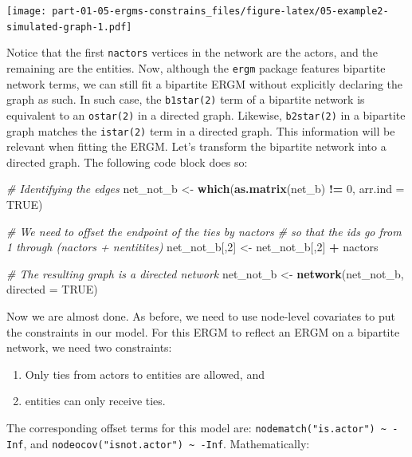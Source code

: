 \documentclass[]{book}
\newenvironment{Shaded}{\begin{snugshade}}{\end{snugshade}}
\newcommand{\CommentTok}[1]{\textcolor[rgb]{0.56,0.35,0.01}{\textit{#1}}}
\newcommand{\DataTypeTok}[1]{\textcolor[rgb]{0.13,0.29,0.53}{#1}}
\newcommand{\DecValTok}[1]{\textcolor[rgb]{0.00,0.00,0.81}{#1}}
\newcommand{\KeywordTok}[1]{\textcolor[rgb]{0.13,0.29,0.53}{\textbf{#1}}}
\newcommand{\NormalTok}[1]{#1}
\newcommand{\OperatorTok}[1]{\textcolor[rgb]{0.81,0.36,0.00}{\textbf{#1}}}
\newcommand{\OtherTok}[1]{\textcolor[rgb]{0.56,0.35,0.01}{#1}}
\newcommand{\StringTok}[1]{\textcolor[rgb]{0.31,0.60,0.02}{#1}}
\providecommand{\tightlist}{%
  \setlength{\itemsep}{0pt}\setlength{\parskip}{0pt}}
\begin{document}
\texttt{[image: part-01-05-ergms-constrains\_files/figure-latex/05-example2-simulated-graph-1.pdf]}

Notice that the first \texttt{nactors} vertices in the network are the actors, and
the remaining are the entities. Now, although the \texttt{ergm} package features
bipartite network terms, we can still fit a bipartite ERGM without explicitly
declaring the graph as such. In such case, the \texttt{b1star(2)} term of a bipartite
network is equivalent to an \texttt{ostar(2)} in a directed graph. Likewise, \texttt{b2star(2)}
in a bipartite graph matches the \texttt{istar(2)} term in a directed graph. This
information will be relevant when fitting the ERGM. Let's transform the bipartite
network into a directed graph. The following code block does so:

\begin{Shaded}
\begin{Highlighting}[]
\CommentTok{# Identifying the edges}
\NormalTok{net_not_b <-}\StringTok{ }\KeywordTok{which}\NormalTok{(}\KeywordTok{as.matrix}\NormalTok{(net_b) }\OperatorTok{!=}\StringTok{ }\DecValTok{0}\NormalTok{, }\DataTypeTok{arr.ind =} \OtherTok{TRUE}\NormalTok{)}

\CommentTok{# We need to offset the endpoint of the ties by nactors}
\CommentTok{# so that the ids go from 1 through (nactors + nentitites)}
\NormalTok{net_not_b[,}\DecValTok{2}\NormalTok{] <-}\StringTok{ }\NormalTok{net_not_b[,}\DecValTok{2}\NormalTok{] }\OperatorTok{+}\StringTok{ }\NormalTok{nactors}

\CommentTok{# The resulting graph is a directed network}
\NormalTok{net_not_b <-}\StringTok{ }\KeywordTok{network}\NormalTok{(net_not_b, }\DataTypeTok{directed =} \OtherTok{TRUE}\NormalTok{)}
\end{Highlighting}
\end{Shaded}

Now we are almost done. As before, we need to use node-level covariates
to put the constraints in our model. For this ERGM to reflect an ERGM on
a bipartite network, we need two constraints:

\begin{enumerate}
\def\labelenumi{\arabic{enumi}.}
\tightlist
\item
  Only ties from actors to entities are allowed, and
\item
  entities can only receive ties.
\end{enumerate}

The corresponding offset terms for this model are: \texttt{nodematch("is.actor")\ \textasciitilde{}\ -Inf},
and \texttt{nodeocov("isnot.actor")\ \textasciitilde{}\ -Inf}. Mathematically:
\end{document}

